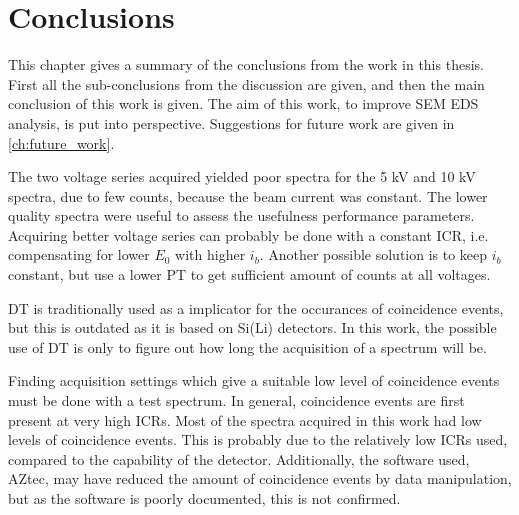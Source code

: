 \chapter{Conclusions}
\label{ch:conclusion}

This chapter gives a summary of the conclusions from the work in this thesis. 
First all the sub-conclusions from the discussion are given, and then the main conclusion of this work is given.
The aim of this work, to improve SEM EDS analysis, is put into perspective.
Suggestions for future work are given in \cref{ch:future_work}.








The two voltage series acquired yielded poor spectra for the 5 kV and 10 kV spectra, due to few counts, because the beam current was constant.
The lower quality spectra were useful to assess the usefulness performance parameters.
Acquiring better voltage series can probably be done with a constant ICR, i.e. compensating for lower $E_0$ with higher $i_b$.
Another possible solution is to keep $i_b$ constant, but use a lower PT to get sufficient amount of counts at all voltages.

DT is traditionally used as a implicator for the occurances of coincidence events, but this is outdated as it is based on Si(Li) detectors.
In this work, the possible use of DT is only to figure out how long the acquisition of a spectrum will be. 

Finding acquisition settings which give a suitable low level of coincidence events must be done with a test spectrum.
In general, coincidence events are first present at very high ICRs.
Most of the spectra acquired in this work had low levels of coincidence events.
This is probably due to the relatively low ICRs used, compared to the capability of the detector.
Additionally, the software used, AZtec, may have reduced the amount of coincidence events by data manipulation, but as the software is poorly documented, this is not confirmed.



